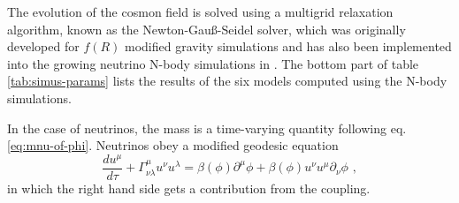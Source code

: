 The evolution of the cosmon field is solved using a multigrid relaxation
algorithm, known as the Newton-Gauß-Seidel solver, which was originally
developed for $f(R)$ modified gravity simulations \cite{puchwein_modified-gravity-gadget:_2013}
and has also been implemented into the growing neutrino N-body simulations
in \cite{ayaita_nonlinear_2016}. The bottom part of table \ref{tab:simus-params}
lists the results of the six models computed using the N-body simulations.

In the case of neutrinos, the mass is a time-varying quantity following
eq.\ref{eq:mnu-of-phi}. Neutrinos obey a modified geodesic
equation 
\begin{equation}
\frac{du^{\mu}}{d\tau}+\Gamma_{\nu\lambda}^{\mu}u^{\nu}u^{\lambda}=\beta(\phi)\partial^{\mu}\phi+\beta(\phi)u^{\nu}u^{\mu}\partial_{\nu}\phi\,\,,
\end{equation}
in which the right hand side gets a contribution from the coupling.

